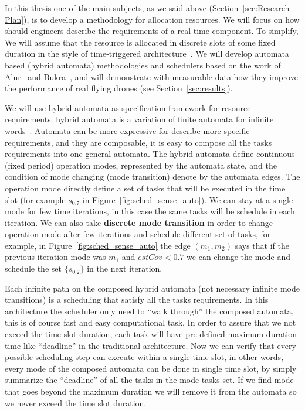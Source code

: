\documentclass[11pt]{article}
\begin{document}
In this thesis one of the main subjects, as we said above (Section~\ref{sec:Research Plan}), is to develop a methodology for allocation resources. We will focus on how should engineers describe the requirements of a real-time component.
To simplify, We will assume that the resource is allocated in discrete slots of some fixed duration in the style of time-triggered architecture~\cite{RTComposer}.
We will develop automata based (hybrid automata) methodologies and schedulers based on the work of Alur~\cite{RTComposer} and Bukra~\cite{Merav}, and will demonstrate with measurable data how they improve the performance of real flying drones (see Section~\ref{sec:results}).

We will use hybrid automata as specification framework for resource requirements.
hybrid automata is a variation of finite automata for infinite words~\cite{hibrid-systems}.
Automata can be more expressive for describe more specific requirements, and they are composable, it is easy to compose all the tasks requirements into one general automata.
The hybrid automata define continuous (fixed period) operation modes, represented by the automata state, and the condition of mode changing (mode transition) denote by the automata edges.
The operation mode directly define a set of tasks that will be executed in the time slot (for example $s_{0.7}$ in Figure~\ref{fig:sched_sense_auto}).
We can stay at a single mode for few time iterations, in this case the same tasks will be schedule in each iteration. 
We can also take \textbf{discrete mode transition} in order to change operation mode after few iterations and schedule different set of tasks, for example, in Figure~\ref{fig:sched_sense_auto} the edge $(m_1,m_2)$ says that if the previous iteration mode was $m_1$ and $estCov < 0.7$ we can change the mode and schedule the set $\{s_{0.2}\}$ in the next iteration.

Each infinite path on the composed hybrid automata (not necessary infinite mode transitions) is a scheduling that satisfy all the tasks requirements. 
In this architecture the scheduler only need to ``walk through'' the composed automata, this is of course fast and easy computational task. 
In order to assure that we not exceed the time slot duration, each task will have pre-defined maximum duration time like ``deadline'' in the traditional architecture. Now we can verify that every possible scheduling step can execute within a single time slot, in other words, every mode of the composed automata can be done in single time slot, by simply summarize the ``deadline'' of all the tasks in the mode tasks set.
If we find mode that goes beyond the maximum duration we will remove it from the automata so we never exceed the time slot duration.
\end{document}
